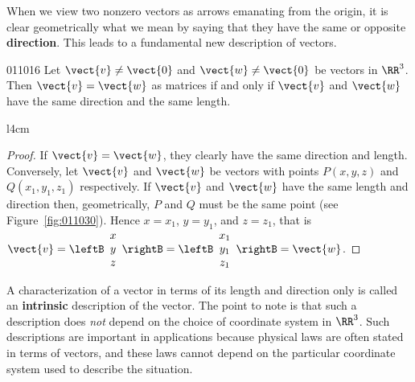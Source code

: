 When
 we view two nonzero vectors as arrows emanating from the origin, it is 
clear geometrically what we mean by saying that they have the same or 
opposite \textbf{direction}. This leads to a fundamental new description of vectors.


\begin{theorem}{}{011016}
Let $\vect{v} \neq \vect{0}$ and $\vect{w} \neq \vect{0}$ be vectors in $\RR^3$. Then $\vect{v} = \vect{w}$ as matrices if and only if $\vect{v}$ and $\vect{w}$ have the same direction and the same length.\footnotemark
\end{theorem}

\begin{wrapfigure}[5]{l}{4cm} 
  \vspace*{-1em}
	\centering
	
	\caption{\label{fig:011030}}
\end{wrapfigure}

\begin{proof} If $\vect{v} = \vect{w}$, they clearly have the same direction and length. Conversely, let $\vect{v}$ and $\vect{w}$ be vectors with points $P(x, y, z)$ and $Q(x_{1}, y_{1}, z_{1})$ respectively. If $\vect{v}$ and $\vect{w}$ have the same length and direction then, geometrically, $P$ and $Q$ must be the same point (see Figure~\ref{fig:011030}). Hence $x = x_{1}$, $y = y_{1}$, and $z = z_{1}$, that is 
$\vect{v} = \leftB
\begin{array}{c}
x \\
y \\
z 
\end{array}
\rightB
=
\leftB
\begin{array}{c}
x_{1} \\
y_{1} \\
z_{1} 
\end{array}
\rightB
=
\vect{w}$. \end{proof}


A characterization of a vector in terms of its length and direction only is called an \textbf{intrinsic} description of the vector. The point to note is that such a description does \textit{not} depend on the choice of coordinate system in $\RR^3$. Such descriptions are important in applications because physical laws are often stated in terms of vectors, and these laws cannot depend on the particular coordinate system used to describe the situation.

